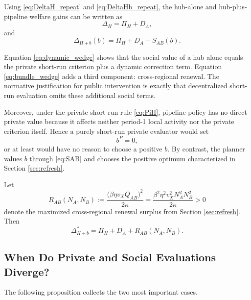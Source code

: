 Using \eqref{eq:DeltaH_repeat} and \eqref{eq:DeltaHb_repeat}, the hub-alone and hub-plus-pipeline welfare gains can be written as
\begin{equation}
\Delta_H
=
\Pi_H + D_A,
\label{eq:dynamic_wedge}
\end{equation}
and
\begin{equation}
\Delta_{H+b}(b)
=
\Pi_H + D_A + S_{AB}(b).
\label{eq:bundle_wedge}
\end{equation}

Equation \eqref{eq:dynamic_wedge} shows that the social value of a hub alone equals the private short-run criterion plus a dynamic correction term. Equation \eqref{eq:bundle_wedge} adds a third component: cross-regional renewal. The normative justification for public intervention is exactly that decentralized short-run evaluation omits these additional social terms.

Moreover, under the private short-run rule \eqref{eq:PiH}, pipeline policy has no direct private value because it affects neither period-1 local activity nor the private criterion itself. Hence a purely short-run private evaluator would set
\[
b^{P}=0,
\]
or at least would have no reason to choose a positive $b$. By contrast, the planner values $b$ through \eqref{eq:SAB} and chooses the positive optimum characterized in Section \ref{sec:refresh}.

Let
\begin{equation}
R_{AB}(N_A,N_B)
:=
\frac{\bigl(\beta\eta v_X Q_{AB}\bigr)^2}{2\kappa}
=
\frac{\beta^2\eta^2 v_X^2 N_A^2N_B^2}{2\kappa}
>0
\label{eq:RAB_sec5}
\end{equation}
denote the maximized cross-regional renewal surplus from Section \ref{sec:refresh}. Then
\begin{equation}
\Delta_{H+b}^*
=
\Pi_H + D_A + R_{AB}(N_A,N_B).
\label{eq:bundle_wedge_star}
\end{equation}

\subsection{When Do Private and Social Evaluations Diverge?}

The following proposition collects the two most important cases.

